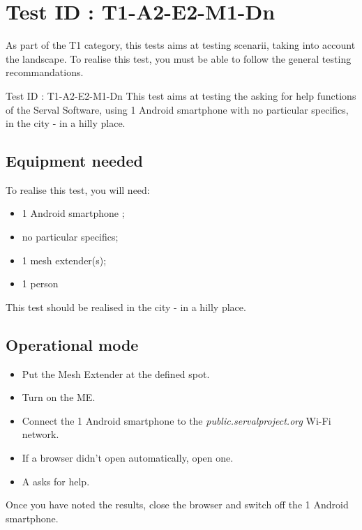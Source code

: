 \documentclass[oneside]{book}
\begin{document}
\section{Test ID : T1-A2-E2-M1-Dn}
\begin{itshape}
As part of the T1 category, this tests aims at testing scenarii, taking into account the landscape. 
To realise this test, you must be able to follow the general testing recommandations.
\end{itshape}
\newline
Test ID : T1-A2-E2-M1-Dn
 This test aims at testing the asking for help functions of the Serval Software, using 1 Android smartphone with no particular specifics, in the city - in a hilly place.
\subsection{Equipment needed} To realise this test, you will need:
\begin{itemize}
\item 1 Android smartphone ;
\item no particular specifics;
\item 1 mesh extender(s);
\item 1 person
\end{itemize}
This test should be realised in the city - in a hilly place.
\subsection{Operational mode} \begin{itemize}
\item Put the Mesh Extender at the defined spot.
\item Turn on the ME.
\item Connect the 1 Android smartphone to the \emph{public.servalproject.org} Wi-Fi network.
\item If a browser didn't open automatically, open one.
\item A asks for help.
\end{itemize}
Once you have noted the results, close the browser and switch off the 1 Android smartphone.
\end{document}
